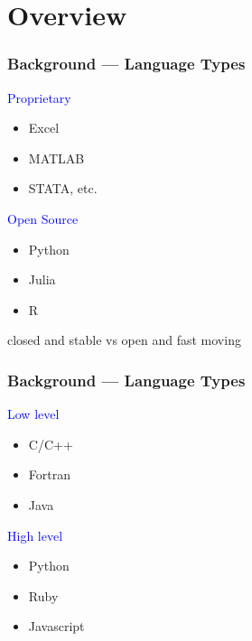 \documentclass[
    xcolor={svgnames},
    hyperref={colorlinks, citecolor=DeepPink4, linkcolor=DarkRed, urlcolor=DarkBlue}
    ]{beamer}  %
\newcommand{\blue}[1]{\textcolor{Blue}{\sf #1}}
\newcommand{\1}{\mathbbm 1}
\begin{document}
\section{Overview}


\begin{frame}
    \frametitle{Background --- Language Types}
    
    \blue{Proprietary} 
    \begin{itemize}
        \item Excel
        \item MATLAB
        \item STATA, etc.
    \end{itemize}
    

    \vspace{0.5em}
    \vspace{0.5em}
    \blue{Open Source} 
    
    \begin{itemize}
        \item Python
        \item Julia
        \item R
    \end{itemize}


    \begin{center}
        closed and stable vs open and fast moving
    \end{center}

\end{frame}





\begin{frame}
    \frametitle{Background --- Language Types}
    
    \blue{Low level } 
    
    \begin{itemize}
        \item C/C++
        \item Fortran
        \item Java
    \end{itemize}

    \vspace{1em}

    \blue{High level } 

    \begin{itemize}
        \item Python
        \item Ruby
        \item Javascript
    \end{itemize}

\end{frame}
\end{document}
